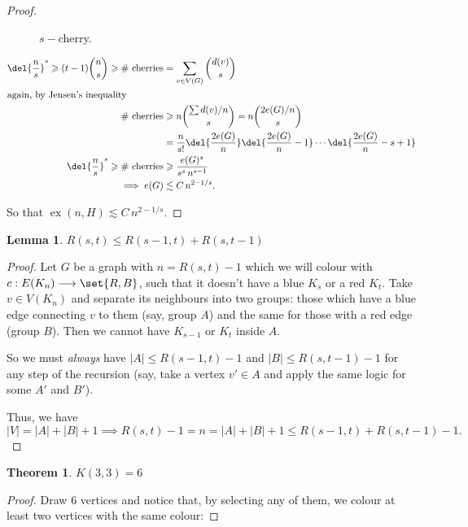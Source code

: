 \documentclass[english]{IMTexam}
\newtheorem{theorem}{Theorem}
\newtheorem{lemma}{Lemma}
\DeclareMathOperator{\ex}{ex}
\begin{document}
\begin{questions}
\begin{proof}
\begin{figure}[h]
				\caption{$ s- $cherry.}
			\end{figure}
			
			
			\begin{align*}
				\del{\dfrac{n}{s}}^{s}\geqslant (t-1)\binom{n}{s}\geqslant\textup{\# cherries}&=\sum_{v\in V(G)}\binom{d(v)}{s}\\
				\intertext{again, by Jensen's inequality}
				\textup{\# cherries}&\geqslant n\binom{\sum d(v)/n}{s}=n\binom{2e(G)/n}{s}\\
				&= \dfrac{n}{s!}\del{\dfrac{2e(G)}{n}}\del{\dfrac{2e(G)}{n}-1}\cdots \del{\dfrac{2e(G)}{n}-s+1}\\
				\del{\dfrac{n}{s}}^{s}\geqslant\textup{\# cherries}&\geqslant \dfrac{e(G)^{s}}{s^{s}\,n^{s-1}}\\
				\implies e(G)&\lesssim C\,n^{2-1/s}.
			\end{align*}
			
			So that $ \ex(n,H)\lesssim C\,n^{2-1/s} $.
		\end{proof}
		
		
		\begin{lemma}\label{lem:Rineq}
			$ R(s,t)\leqslant R(s-1,t)+R(s,t-1) $
		\end{lemma}
		
		\begin{proof}
			Let $ G $ be a graph with $ n=R(s,t)-1 $ which we will colour with $ c:E(K_n)\longrightarrow\set{R,B} $, such that it doesn't have a {\color{cyan}blue $ K_s $} or a {\color{red}red $ K_t $}. Take $ v\in V(K_n) $ and separate its neighbours into two groups: those which have a blue edge connecting $ v $ to them (say, group $ A $) and the same for those with a red edge (group $ B $). Then we cannot have {\color{cyan} $ K_{s-1} $} or {\color{red} $ K_t $} inside $ A $.
			
			So we must \textit{always} have $ |A|\leqslant R(s-1,t)-1 $ and $ |B|\leqslant R(s,t-1)-1 $ for any step of the recursion (say, take a vertex $ v'\in A $ and apply the same logic for some $ A' $ and $ B' $).
			
			Thus, we have
			\[ |V|=|A|+|B|+1\implies R(s,t)-1=n=|A|+|B|+1\leqslant R(s-1,t)+R(s,t-1)-1. \]
		\end{proof}
	
		\begin{theorem}\label{thm:R33}
			$ K(3,3)=6 $
		\end{theorem}
		
		\begin{proof}
			Draw $ 6 $ vertices and notice that, by selecting any of them, we colour at least two vertices with the same colour:
			

\end{proof}
\end{questions}
\end{document}
